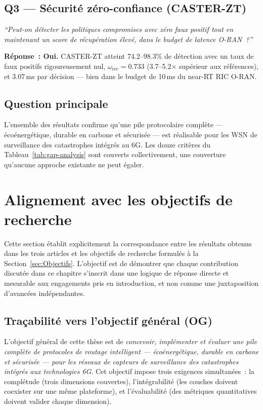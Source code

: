 \subsection{Q3 --- Sécurité zéro-confiance (CASTER-ZT)}

\noindent\textit{``Peut-on détecter les politiques compromises avec zéro faux positif tout en maintenant un score de récupération élevé, dans le budget de latence O-RAN~?''}

\medskip
\noindent\textbf{Réponse~: Oui.} CASTER-ZT atteint 74.2--98.3\% de détection avec un taux de faux positifs rigoureusement nul, $\omega_{\text{rec}} = 0.733$ (3.7--5.2$\times$ supérieur aux références), et 3.07\,ms par décision --- bien dans le budget de 10\,ms du near-RT RIC O-RAN.

\subsection{Question principale}

L'ensemble des résultats confirme qu'une pile protocolaire complète --- écoénergétique, durable en carbone et sécurisée --- est réalisable pour les WSN de surveillance des catastrophes intégrés au 6G. Les douze critères du Tableau~\ref{tab:gap-analysis} sont couverts collectivement, une couverture qu'aucune approche existante ne peut égaler.


\section{Alignement avec les objectifs de recherche}\label{sec:disc-alignement}

Cette section établit explicitement la correspondance entre les résultats obtenus dans les trois articles et les objectifs de recherche formulés à la Section~\ref{sec:Objectifs}. L'objectif est de démontrer que chaque contribution discutée dans ce chapitre s'inscrit dans une logique de réponse directe et mesurable aux engagements pris en introduction, et non comme une juxtaposition d'avancées indépendantes.

\subsection{Traçabilité vers l'objectif général (OG)}

L'objectif général de cette thèse est de \emph{concevoir, implémenter et évaluer une pile complète de protocoles de routage intelligent --- écoénergétique, durable en carbone et sécurisée --- pour les réseaux de capteurs de surveillance des catastrophes intégrés aux technologies 6G}. Cet objectif impose trois exigences simultanées~: la complétude (trois dimensions couvertes), l'intégrabilité (les couches doivent coexister sur une même plateforme), et l'évaluabilité (des métriques quantitatives doivent valider chaque dimension).

